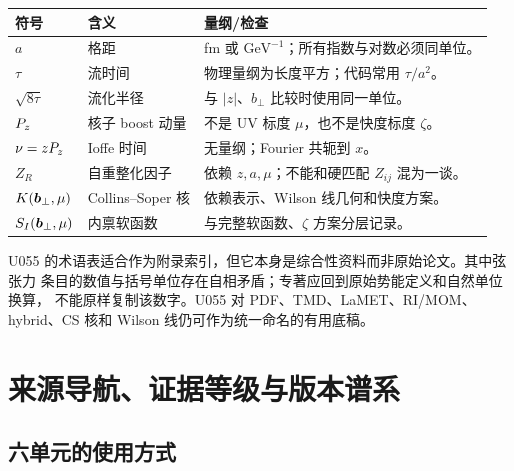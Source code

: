 \begin{tabularx}{\textwidth}{@{}p{}p{}X@{}}
\toprule
符号 & 含义 & 量纲/检查 \\
\midrule
$a$ & 格距 & fm 或 $\mathrm{GeV}^{-1}$；所有指数与对数必须同单位。 \\
$\tau$ & 流时间 & 物理量纲为长度平方；代码常用 $\tau/a^2$。 \\
$\sqrt{8\tau}$ & 流化半径 & 与 $|z|$、$b_\perp$ 比较时使用同一单位。 \\
$P_z$ & 核子 boost 动量 & 不是 UV 标度 $\mu$，也不是快度标度 $\zeta$。 \\
$\nu=zP_z$ & Ioffe 时间 & 无量纲；Fourier 共轭到 $x$。 \\
$Z_R$ & 自重整化因子 & 依赖 $z,a,\mu$；不能和硬匹配 $Z_{ij}$ 混为一谈。 \\
$K(\boldsymbol b_\perp,\mu)$ & Collins--Soper 核 & 依赖表示、Wilson 线几何和快度方案。 \\
$S_I(\boldsymbol b_\perp,\mu)$ & 内禀软函数 & 与完整软函数、$\zeta$ 方案分层记录。 \\
\bottomrule
\end{tabularx}

U055 的术语表适合作为附录索引，但它本身是综合性资料而非原始论文。其中弦张力
条目的数值与括号单位存在自相矛盾；专著应回到原始势能定义和自然单位换算，
不能原样复制该数字。U055 对 PDF、TMD、LaMET、RI/MOM、hybrid、CS 核和
Wilson 线仍可作为统一命名的有用底稿。

\chapter{来源导航、证据等级与版本谱系}

\section{六单元的使用方式}

